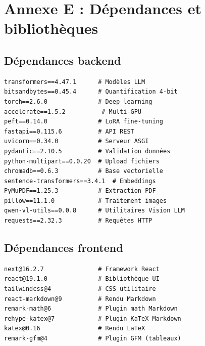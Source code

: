 \documentclass[12pt,a4paper]{report}
\begin{document}
\section{Annexe E : Dépendances et bibliothèques}

\subsection{Dépendances backend}
\begin{verbatim}
transformers==4.47.1      # Modèles LLM
bitsandbytes==0.45.4      # Quantification 4-bit
torch==2.6.0              # Deep learning
accelerate==1.5.2          # Multi-GPU
peft==0.14.0              # LoRA fine-tuning
fastapi==0.115.6          # API REST
uvicorn==0.34.0           # Serveur ASGI
pydantic==2.10.5          # Validation données
python-multipart==0.0.20  # Upload fichiers
chromadb==0.6.3           # Base vectorielle
sentence-transformers==3.4.1  # Embeddings
PyMuPDF==1.25.3           # Extraction PDF
pillow==11.1.0            # Traitement images
qwen-vl-utils==0.0.8      # Utilitaires Vision LLM
requests==2.32.3          # Requêtes HTTP
\end{verbatim}

\subsection{Dépendances frontend}
\begin{verbatim}
next@16.2.7               # Framework React
react@19.1.0              # Bibliothèque UI
tailwindcss@4             # CSS utilitaire
react-markdown@9          # Rendu Markdown
remark-math@6             # Plugin math Markdown
rehype-katex@7            # Plugin KaTeX Markdown
katex@0.16                # Rendu LaTeX
remark-gfm@4              # Plugin GFM (tableaux)
\end{verbatim}
\end{document}
